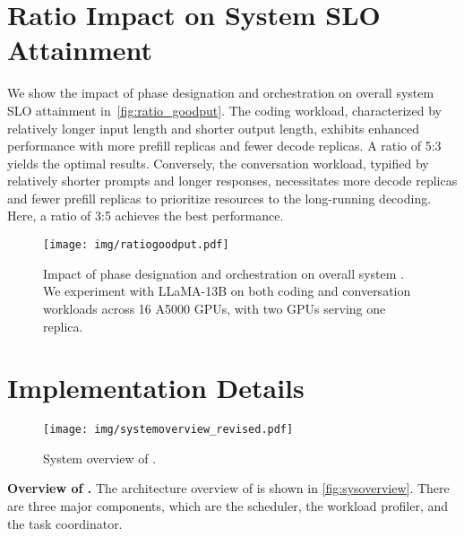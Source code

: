 \section{Ratio Impact on System SLO Attainment}
\label{appendix:ratio}

We show the impact of phase designation and orchestration on overall system SLO attainment in~\autoref{fig:ratio_goodput}.
The coding workload, characterized by relatively longer input length and
shorter output length, exhibits enhanced performance with more prefill replicas and fewer decode replicas. A ratio of 5:3 yields the optimal results. Conversely, the conversation workload, typified by relatively shorter prompts and longer responses, necessitates more decode replicas and fewer prefill replicas to prioritize resources to the long-running decoding. Here, a ratio of 3:5 achieves the best performance.

\begin{figure}[!t] 
  \centering
  \texttt{[image: img/ratiogoodput.pdf]} %
  \caption{{Impact of phase designation and orchestration on overall system . We experiment with LLaMA-13B on both coding and conversation workloads across 16 A5000 GPUs, with two GPUs serving one replica.}}
  \label{fig:ratio_goodput}
\end{figure}

\section{Implementation Details}
\label{appendix:components}

\begin{figure}[!t]
  \centering
  \texttt{[image: img/systemoverview\_revised.pdf]} %
  \vspace{-1em}
  \caption{System overview of \sys.}
  \label{fig:sysoverview}
  \vspace{-1em}
\end{figure}

\noindent \textbf{Overview of \sys.} 
The architecture overview of \sys is shown in \autoref{fig:sysoverview}. There are three major components, which are the scheduler, the workload profiler, and the task coordinator.

